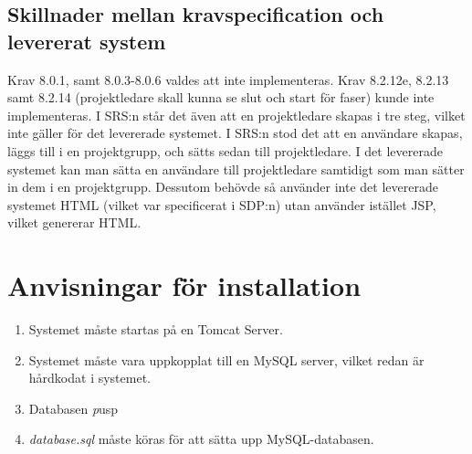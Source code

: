 \documentclass[paper=a4, fontsize=11pt,twoside]{article}
\begin{document}
\subsection{Skillnader mellan kravspecification och levererat system}
Krav 8.0.1, samt 8.0.3-8.0.6 valdes att inte implementeras. %
\flushleft
Krav 8.2.12e, 8.2.13 samt 8.2.14 (projektledare skall kunna se slut och start
för faser) kunde inte implementeras. I SRS:n står det även att en projektledare skapas i tre steg, vilket inte gäller för det levererade systemet. I SRS:n stod det att en användare skapas, läggs till i en projektgrupp, och sätts sedan till projektledare. I det levererade systemet kan man sätta en användare till projektledare samtidigt som man sätter in dem i en projektgrupp. Dessutom behövde så använder inte det levererade systemet HTML (vilket var specificerat i SDP:n) utan använder istället JSP, vilket genererar HTML.

\newpage
\section{Anvisningar för installation}
% 
% 
% 
\begin{enumerate}
\item Systemet måste startas på en Tomcat Server.
\item Systemet måste vara uppkopplat till en MySQL server, vilket redan är
hårdkodat i systemet.
\item Databasen \textit pusp
\item \textit{database.sql} måste köras för att sätta upp MySQL-databasen.
\end{enumerate}
\end{document}
